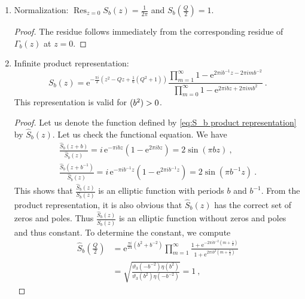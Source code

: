 \documentclass[12pt,a4paper]{article}
\newcommand{\be}{\begin{equation}}
\newcommand{\ee}{\end{equation}}
\newcommand\Li{\text{Li}}
\let\Im\relax
\DeclareMathOperator\Im{Im}
\DeclareMathOperator*{\Res}{Res}
\begin{document}
\begin{enumerate}
\begin{proof}
\be 
    f(\zeta)=-\frac{\pi i}{12}(1-6 \zeta+6 \zeta^2)+\frac{i}{4\pi} \Li_2\left(\mathrm{e}^{-2\pi i \zeta}\right)\ .
\ee
We also have the standard dilogarithm identity with the standard choice of branch cut running from $(1,\infty)$
\be 
\Li_2\left(\frac{1}{z}\right)=-\Li_2(z)-\frac{\pi^2}{6}-\frac{1}{2}\log^2(-z)\ ,
\ee
which gives $f(\zeta)=-\frac{i}{4\pi} \Li_2(\mathrm{e}^{-2\pi i \zeta})$ also for $\Im \zeta>0$. Thus the result \eqref{eq:S_b classical limit} follows.
    \end{proof}
    \item Normalization: $\Res_{z=0} S_b(z)=\frac{1}{2\pi}$ and $S_b(\frac{Q}{2})=1$.  
    \begin{proof}
        The residue follows immediately from the corresponding residue of $\Gamma_b(z)$ at $z=0$.
    \end{proof}
    \item Infinite product representation:
    \be 
        S_b(z)=\mathrm{e}^{-\frac{\pi i}{2}(z^2-Qz+\frac{1}{6}(Q^2+1))}\frac{\prod_{m=1}^\infty 1-\mathrm{e}^{2\pi i b^{-1} z-2\pi i m b^{-2}}}{\prod_{m=0}^\infty 1-\mathrm{e}^{2\pi i b z +2\pi i m b^2}} \ . \label{eq:S_b product representation}
    \ee
    This representation is valid for $\Im (b^2)>0$.
    \begin{proof}
Let us denote the function defined by \eqref{eq:S_b product representation} by $\hat{S}_b(z)$. Let us check the functional equation. We have
\begin{align}
    \frac{\hat{S}_b(z+b)}{\hat{S}_b(z)}=i\, \mathrm{e}^{-\pi i b z} (1-\mathrm{e}^{2\pi i bz})=2 \sin(\pi b z)\ , \\
    \frac{\hat{S}_b(z+b^{-1})}{\hat{S}_b(z)}=i\, \mathrm{e}^{-\pi i b^{-1} z}(1-\mathrm{e}^{2\pi i b^{-1}z})=2 \sin(\pi b^{-1} z)\ .
\end{align}
This shows that $\frac{\hat{S}_b(z)}{S_b(z)}$ is an elliptic function with periods $b$ and $b^{-1}$. From the product representation, it is also obvious that $\hat{S}_b(z)$ has the correct set of zeros and poles. Thus $\frac{\hat{S}_b(z)}{S_b(z)}$ is an elliptic function without zeros and poles and thus constant. To determine the constant, we compute
\begin{align}
    \hat{S}_b\left(\frac{Q}{2}\right)&=\mathrm{e}^{\frac{\pi i}{24}(b^2+b^{-2})} \prod_{m=1}^\infty \frac{1+ \mathrm{e}^{-2\pi i b^{-2} (m+\frac{1}{2})}}{1+\mathrm{e}^{2\pi i b^2(m+\frac{1}{2})}} \\
    &= \sqrt{\frac{\vartheta_3(-b^{-2})\eta(b^{2})}{\vartheta_3(b^{2})\eta(-b^{-2})}}=1\ ,

\end{align}
\end{proof}
\end{enumerate}
\end{document}

